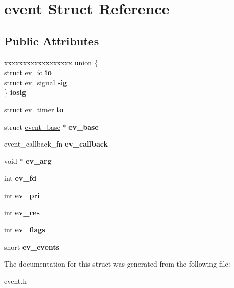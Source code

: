 \hypertarget{structevent}{}\section{event Struct Reference}
\label{structevent}
\subsection*{Public Attributes}
\begin{DoxyCompactItemize}
\item 
\hypertarget{structevent_a668c11f52e6c54f9e2b7d1aef5bbb363}{}\label{structevent_a668c11f52e6c54f9e2b7d1aef5bbb363} 
\begin{tabbing}
xx\=xx\=xx\=xx\=xx\=xx\=xx\=xx\=xx\=\kill
union \{\\
\>struct \hyperlink{structev__io}{ev\_io} {\bfseries io}\\
\>struct \hyperlink{structev__signal}{ev\_signal} {\bfseries sig}\\
\} {\bfseries iosig}\\

\end{tabbing}\item 
\hypertarget{structevent_a2bc71ca847b882aa99871e53e98769bd}{}\label{structevent_a2bc71ca847b882aa99871e53e98769bd} 
struct \hyperlink{structev__timer}{ev\+\_\+timer} {\bfseries to}
\item 
\hypertarget{structevent_ad0ca55c90047d869af935d02b6bf98d3}{}\label{structevent_ad0ca55c90047d869af935d02b6bf98d3} 
struct \hyperlink{structevent__base}{event\+\_\+base} $\ast$ {\bfseries ev\+\_\+base}
\item 
\hypertarget{structevent_a46ff4af8c64f00fdac8aa8c5e6368438}{}\label{structevent_a46ff4af8c64f00fdac8aa8c5e6368438} 
event\+\_\+callback\+\_\+fn {\bfseries ev\+\_\+callback}
\item 
\hypertarget{structevent_a73daed0b06adc2661c2bb5cac36b6d72}{}\label{structevent_a73daed0b06adc2661c2bb5cac36b6d72} 
void $\ast$ {\bfseries ev\+\_\+arg}
\item 
\hypertarget{structevent_ac4e9ba9d79228d625bd80d441df1b6ef}{}\label{structevent_ac4e9ba9d79228d625bd80d441df1b6ef} 
int {\bfseries ev\+\_\+fd}
\item 
\hypertarget{structevent_a19f9705ccad3d699a67399ca64fcfe4e}{}\label{structevent_a19f9705ccad3d699a67399ca64fcfe4e} 
int {\bfseries ev\+\_\+pri}
\item 
\hypertarget{structevent_a5004429f1cad8ddf9406b48bf1ba6365}{}\label{structevent_a5004429f1cad8ddf9406b48bf1ba6365} 
int {\bfseries ev\+\_\+res}
\item 
\hypertarget{structevent_adb6d076d774729e652c274190036698e}{}\label{structevent_adb6d076d774729e652c274190036698e} 
int {\bfseries ev\+\_\+flags}
\item 
\hypertarget{structevent_a4837c3bb776378d92ce46720ecfd71be}{}\label{structevent_a4837c3bb776378d92ce46720ecfd71be} 
short {\bfseries ev\+\_\+events}
\end{DoxyCompactItemize}


The documentation for this struct was generated from the following file\+:\begin{DoxyCompactItemize}
\item 
event.\+h\end{DoxyCompactItemize}
